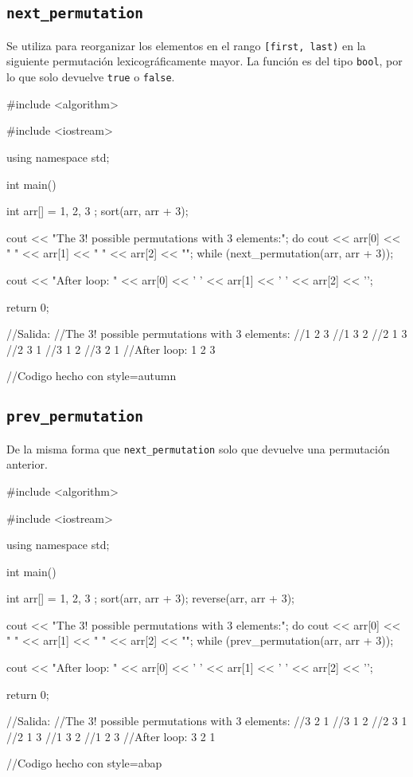 \documentclass[a4paper,11pt]{article}
\begin{document}
\subsection*{\texttt{next\_permutation}}
Se utiliza para reorganizar los elementos en el rango \texttt{[first, last)} en la siguiente permutación lexicográficamente mayor. La función es del tipo \texttt{bool}, por lo que solo devuelve \texttt{true} o \texttt{false}.
\begin{pyglist}[language=c++,caption={next\_permutation},listingname={\textbf{Ejemplo}},style=autumn]
#include <algorithm>  

#include <iostream> 

using namespace std; 

int main() { 
    int arr[] = { 1, 2, 3 }; 
    sort(arr, arr + 3); 
  
    cout << "The 3! possible permutations with 3 elements:\n"; 
    do { 
        cout << arr[0] << " " << arr[1] << " " << arr[2] << "\n"; 
    } while (next_permutation(arr, arr + 3)); 

    cout << "After loop: " << arr[0] << ' ' 
         << arr[1] << ' ' << arr[2] << '\n'; 

    return 0; 
} 
//Salida:
//The 3! possible permutations with 3 elements:
//1 2 3
//1 3 2
//2 1 3
//2 3 1
//3 1 2
//3 2 1
//After loop: 1 2 3

//Codigo hecho con style=autumn
\end{pyglist}
\newpage
\subsection*{\texttt{prev\_permutation}}
De la misma forma que \texttt{next\_permutation} solo que devuelve una permutación anterior.
\begin{pyglist}[language=c++,caption={prev\_permutation},listingname={\textbf{Ejemplo}},style=abap]
#include <algorithm>  

#include <iostream> 

using namespace std; 

int main() { 
    int arr[] = { 1, 2, 3 }; 
    sort(arr, arr + 3); 
    reverse(arr, arr + 3); 
 
    cout << "The 3! possible permutations with 3 elements:\n"; 
    do { 
        cout << arr[0] << " " << arr[1] << " " << arr[2] << "\n"; 
    } while (prev_permutation(arr, arr + 3)); 

    cout << "After loop: " << arr[0] << ' ' << arr[1]  
         << ' ' << arr[2] << '\n'; 

    return 0; 
} 
//Salida:
//The 3! possible permutations with 3 elements:
//3 2 1
//3 1 2
//2 3 1
//2 1 3
//1 3 2
//1 2 3
//After loop: 3 2 1

//Codigo hecho con style=abap
\end{pyglist}
\newpage
\end{document}
